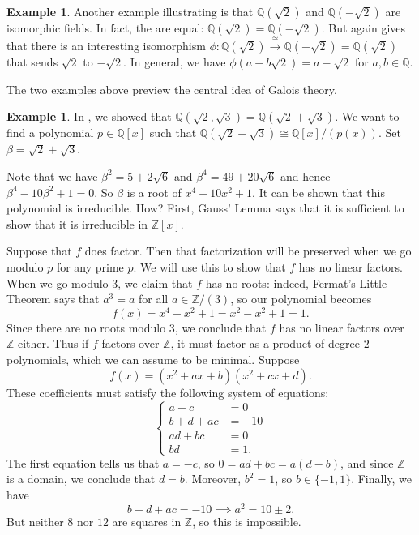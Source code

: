 \documentclass[12pt]{report}
\numberwithin{equation}{section}
\numberwithin{theorem}{chapter}
\theoremstyle{definition}
\newtheorem{example}[theorem]{Example}
\newtheorem*{basic properties}{Basic Properties}
\newtheorem*{Important Remark}{Important Remark}
\begin{document}
\begin{example} 
Another example illustrating  is that $\mathbb{Q}(\sqrt{2})$ and $\mathbb{Q}(-\sqrt{2})$ are isomorphic fields. In fact, the are equal: $\mathbb{Q}(\sqrt2) = \mathbb{Q}(-\sqrt{2})$. But again  gives that there is an interesting isomorphism $\phi: \mathbb{Q}(\sqrt{2}) \xrightarrow{\, \cong \,} \mathbb{Q}(-\sqrt{2}) = \mathbb{Q}(\sqrt{2})$ that sends $\sqrt{2}$ to $-\sqrt{2}$. In general, we have $\phi(a + b \sqrt{2}) = a - \sqrt{2}$ for $a,b \in \mathbb{Q}$.
\end{example}


The two examples above preview the central idea of Galois theory.


\begin{example}\label{example irreducible root 2+3}
In , we showed that $\mathbb{Q}(\sqrt{2},\sqrt{3})=\mathbb{Q}(\sqrt{2}+\sqrt{3})$. We want to find a polynomial $p \in \mathbb{Q}[x]$ such that $\mathbb{Q}(\sqrt{2}+\sqrt{3}) \cong \mathbb{Q}[x]/(p(x))$. Set $\beta=\sqrt{2}+\sqrt{3}$.

Note that we have $\beta^2 = 5 + 2 \sqrt{6}$ and $\beta^4 = 49 + 20 \sqrt{6}$ and hence $\beta^4 - 10 \beta^2 + 1 = 0$. So $\beta$ is a root of $x^4 - 10 x^2 + 1$. It can be shown that this polynomial is irreducible. How? First, Gauss' Lemma says that it is sufficient to show that it is irreducible in $\mathbb{Z}[x]$.

Suppose that $f$ does factor. Then that factorization will be preserved when we go modulo $p$ for any prime $p$. We will use this to show that $f$ has no linear factors. When we go modulo $3$, we claim that $f$ has no roots: indeed, Fermat's Little Theorem says that $a^3=a$ for all $a \in \mathbb{Z}/(3)$, so our polynomial becomes
$$f(x) = x^4-x^2+1=x^2-x^2+1=1.$$
Since there are no roots modulo $3$, we conclude that $f$ has no linear factors over $\mathbb{Z}$ either. Thus if $f$ factors over $\mathbb{Z}$, it must factor as a product of degree $2$ polynomials, which we can assume to be minimal. Suppose
$$f(x) = (x^2+ax+b)(x^2+cx+d).$$
These coefficients must satisfy the following system of equations:
$$\left\lbrace
\begin{array}{ll}
	a+c & = 0 \\
	b+d+ac & = -10 \\
	ad+bc & = 0 \\
	bd & = 1 .
\end{array}
\right.$$
The first equation tells us that $a=-c$, so $0 = ad+bc = a(d-b)$, and since $\mathbb{Z}$ is a domain, we conclude that $d=b$. Moreover, $b^2 = 1$, so $b \in \{ -1, 1 \}$. Finally, we have
$$b+d+ac = -10 \implies a^2 = 10 \pm 2.$$
But neither $8$ nor $12$ are squares in $\mathbb{Z}$, so this is impossible.
\end{example}
\end{document}
